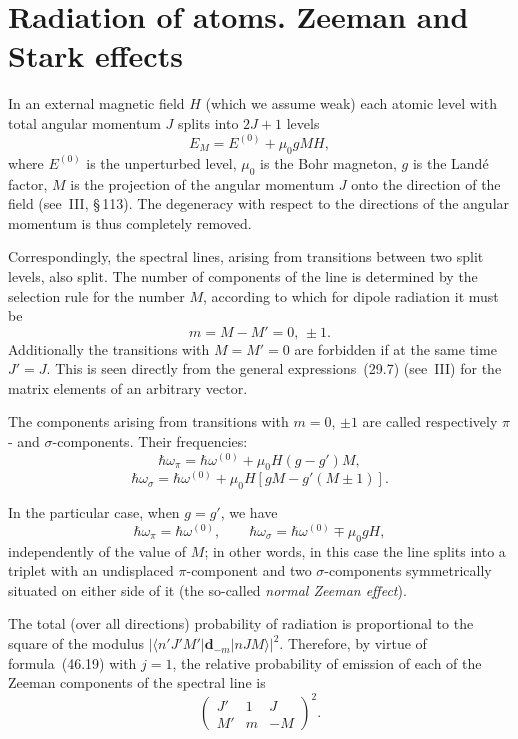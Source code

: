 \section{Radiation of atoms. Zeeman and Stark effects}

In an external magnetic field $H$ (which we assume weak) each atomic level with total angular momentum $J$ splits into $2J + 1$ levels
\begin{equation}
E_M = E^{(0)} + \mu_0 gMH,
\tag{51.1}
\end{equation}
where $E^{(0)}$ is the unperturbed level, $\mu_0$ is the Bohr magneton, $g$ is the Land\'e factor, $M$ is the projection of the angular momentum $J$ onto the direction of the field (see~III, \S\,113). The degeneracy with respect to the directions of the angular momentum is thus completely removed.

Correspondingly, the spectral lines, arising from transitions between two split levels, also split. The number of components of the line is determined by the selection rule for the number $M$, according to which for dipole radiation it must be
\begin{equation}
m = M - M' = 0,\,\pm 1.
\tag{51.2}
\end{equation}
Additionally the transitions with $M = M' = 0$ are forbidden if at the same time $J' = J$. This is seen directly from the general expressions~(29.7) (see~III) for the matrix elements of an arbitrary vector.

The components arising from transitions with $m = 0$, $\pm 1$ are called respectively $\pi$- and $\sigma$-components. Their frequencies:
\begin{equation}
\hbar\omega_\pi = \hbar\omega^{(0)} + \mu_0 H(g - g')M,
\tag{51.3}
\end{equation}
\[
\hbar\omega_\sigma = \hbar\omega^{(0)} + \mu_0 H[gM - g'(M \pm 1)].
\]

In the particular case, when $g = g'$, we have
\begin{equation}
\hbar\omega_\pi = \hbar\omega^{(0)},\qquad \hbar\omega_\sigma = \hbar\omega^{(0)} \mp \mu_0 gH,
\tag{51.4}
\end{equation}
independently of the value of $M$; in other words, in this case the line splits into a triplet with an undisplaced $\pi$-component and two $\sigma$-components symmetrically situated on either side of it (the so-called \textit{normal Zeeman effect}).

The total (over all directions) probability of radiation is proportional to the square of the modulus $|\langle n'J'M'|\mathbf{d}_{-m}|nJM\rangle|^2$. Therefore, by virtue of formula~(46.19) with $j = 1$, the relative probability of emission of each of the Zeeman components of the spectral line is
\begin{equation}
\begin{pmatrix} J' & 1 & J \\ M' & m & -M\end{pmatrix}^{\!2}.
\tag{51.5}
\end{equation}

